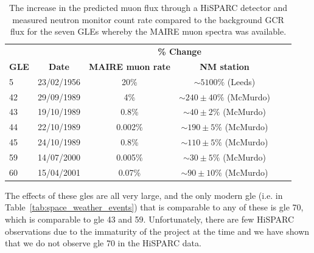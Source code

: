 \begin{table}
	\begin{center}
		\caption{The increase in the predicted muon flux through a HiSPARC detector and measured neutron monitor count rate compared to the background GCR flux for the seven GLEs whereby the MAIRE muon spectra was available.}
		\label{tab:MAIRE_GLEs}
		\begin{tabular}{l c c c c c}
			\hline
			 &  & \multicolumn{2}{c}{\bf \% Change} \\
			{\bf GLE} & {\bf Date} & {\bf MAIRE muon rate} & {\bf NM station} \\
			\hline
			5 & 23/02/1956 & 20\% & $\sim 5100\%$ (Leeds) \\
			42 & 29/09/1989 & 4\% & $\sim 240 \pm 40\%$ (McMurdo) \\
			43 & 19/10/1989 & 0.8\% & $\sim 40 \pm 2\%$ (McMurdo) \\
			44  & 22/10/1989 & 0.002\% & $\sim 190 \pm 5\%$ (McMurdo) \\
			45  & 24/10/1989 & 0.8\% & $\sim 110 \pm 5\%$ (McMurdo) \\
			59 & 14/07/2000 & 0.005\% & $\sim 30 \pm 5\%$ (McMurdo) \\
			60 & 15/04/2001 & 0.07\% & $\sim 90 \pm 10\%$ (McMurdo) \\
			\hline
		\end{tabular}
	\end{center}
\end{table}

The effects of these \glspl{gle} are all very large, and the only modern \gls{gle} (i.e. in Table~\ref{tab:space_weather_events}) that is comparable to any of these is \gls{gle} 70, which is comparable to \gls{gle} 43 and 59. Unfortunately, there are few HiSPARC observations due to the immaturity of the project at the time and we have shown that we do not observe \gls{gle} 70 in the HiSPARC data.


